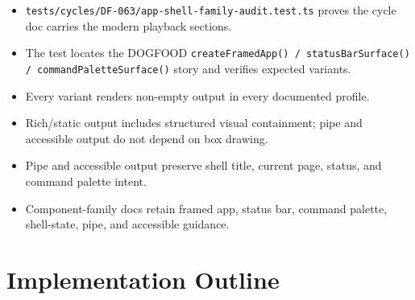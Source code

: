 \begin{itemize}
\tightlist
\item
  \texttt{t\allowbreak{}e\allowbreak{}s\allowbreak{}t\allowbreak{}s\allowbreak{}/\allowbreak{}c\allowbreak{}y\allowbreak{}c\allowbreak{}l\allowbreak{}e\allowbreak{}s\allowbreak{}/\allowbreak{}D\allowbreak{}F\allowbreak{}-\allowbreak{}0\allowbreak{}6\allowbreak{}3\allowbreak{}/\allowbreak{}a\allowbreak{}p\allowbreak{}p\allowbreak{}-\allowbreak{}s\allowbreak{}h\allowbreak{}e\allowbreak{}l\allowbreak{}l\allowbreak{}-\allowbreak{}f\allowbreak{}a\allowbreak{}m\allowbreak{}i\allowbreak{}l\allowbreak{}y\allowbreak{}-\allowbreak{}a\allowbreak{}u\allowbreak{}d\allowbreak{}i\allowbreak{}t\allowbreak{}.\allowbreak{}t\allowbreak{}e\allowbreak{}s\allowbreak{}t\allowbreak{}.\allowbreak{}t\allowbreak{}s} proves the cycle doc carries the modern playback sections.
\item
  The test locates the DOGFOOD \texttt{c\allowbreak{}r\allowbreak{}e\allowbreak{}a\allowbreak{}t\allowbreak{}e\allowbreak{}F\allowbreak{}r\allowbreak{}a\allowbreak{}m\allowbreak{}e\allowbreak{}d\allowbreak{}A\allowbreak{}p\allowbreak{}p\allowbreak{}(\allowbreak{})\allowbreak{} \allowbreak{}/\allowbreak{} \allowbreak{}s\allowbreak{}t\allowbreak{}a\allowbreak{}t\allowbreak{}u\allowbreak{}s\allowbreak{}B\allowbreak{}a\allowbreak{}r\allowbreak{}S\allowbreak{}u\allowbreak{}r\allowbreak{}f\allowbreak{}a\allowbreak{}c\allowbreak{}e\allowbreak{}(\allowbreak{})\allowbreak{} \allowbreak{}/\allowbreak{} \allowbreak{}c\allowbreak{}o\allowbreak{}m\allowbreak{}m\allowbreak{}a\allowbreak{}n\allowbreak{}d\allowbreak{}P\allowbreak{}a\allowbreak{}l\allowbreak{}e\allowbreak{}t\allowbreak{}t\allowbreak{}e\allowbreak{}S\allowbreak{}u\allowbreak{}r\allowbreak{}f\allowbreak{}a\allowbreak{}c\allowbreak{}e\allowbreak{}(\allowbreak{})} story and verifies expected variants.
\item
  Every variant renders non-empty output in every documented profile.
\item
  Rich/static output includes structured visual containment; pipe and accessible output do not depend on box drawing.
\item
  Pipe and accessible output preserve shell title, current page, status, and command palette intent.
\item
  Component-family docs retain framed app, status bar, command palette, shell-state, pipe, and accessible guidance.
\end{itemize}

\section{Implementation Outline}\label{record-104-implementation-outline}

